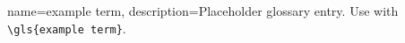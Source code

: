{
    name=example term,
    description={Placeholder glossary entry. Use with \texttt{\textbackslash gls\{example term\}}.}
}

